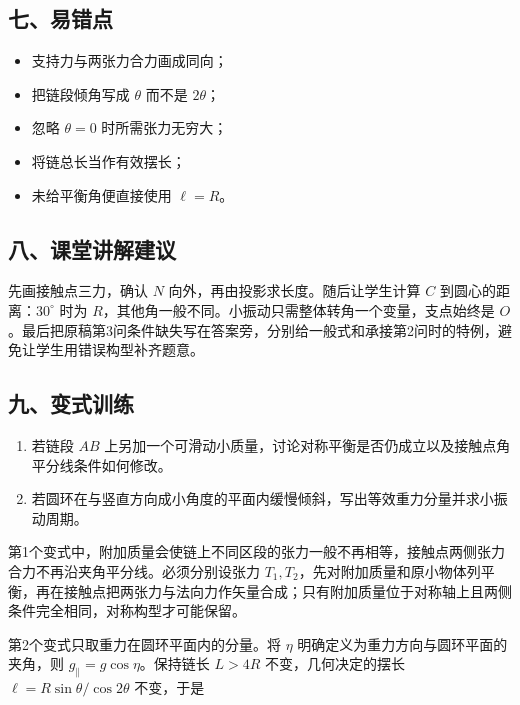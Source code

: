 \documentclass[12pt,a4paper,UTF8]{ctexart}
\newcommand{\tightlist}{\setlength{\itemsep}{0pt}\setlength{\parskip}{0pt}}
\begin{document}
\subsection{七、易错点}\label{ux4e03ux6613ux9519ux70b9-6}

\begin{itemize}
\tightlist
\item
  支持力与两张力合力画成同向；
\item
  把链段倾角写成 \(\theta\) 而不是 \(2\theta\)；
\item
  忽略 \(\theta=0\) 时所需张力无穷大；
\item
  将链总长当作有效摆长；
\item
  未给平衡角便直接使用 \(\ell=R\)。
\end{itemize}

\subsection{八、课堂讲解建议}\label{ux516bux8bfeux5802ux8bb2ux89e3ux5efaux8bae-6}

先画接触点三力，确认 \(N\) 向外，再由投影求长度。随后让学生计算 \(C\)
到圆心的距离：\(30^\circ\) 时为
\(R\)，其他角一般不同。小振动只需整体转角一个变量，支点始终是
\(O\)。最后把原稿第3问条件缺失写在答案旁，分别给一般式和承接第2问时的特例，避免让学生用错误构型补齐题意。

\subsection{九、变式训练}\label{ux4e5dux53d8ux5f0fux8badux7ec3-6}

\begin{enumerate}
\def\labelenumi{\arabic{enumi}.}
\tightlist
\item
  若链段 \(AB\)
  上另加一个可滑动小质量，讨论对称平衡是否仍成立以及接触点角平分线条件如何修改。
\item
  若圆环在与竖直方向成小角度的平面内缓慢倾斜，写出等效重力分量并求小振动周期。
\end{enumerate}

第1个变式中，附加质量会使链上不同区段的张力一般不再相等，接触点两侧张力合力不再沿夹角平分线。必须分别设张力
\(T_1,T_2\)，先对附加质量和原小物体列平衡，再在接触点把两张力与法向力作矢量合成；只有附加质量位于对称轴上且两侧条件完全相同，对称构型才可能保留。

第2个变式只取重力在圆环平面内的分量。将 \(\eta\)
明确定义为重力方向与圆环平面的夹角，则
\(g_\parallel=g\cos\eta\)。保持链长 \(L>4R\) 不变，几何决定的摆长
\(\ell=R\sin\theta/\cos2\theta\) 不变，于是
\end{document}
